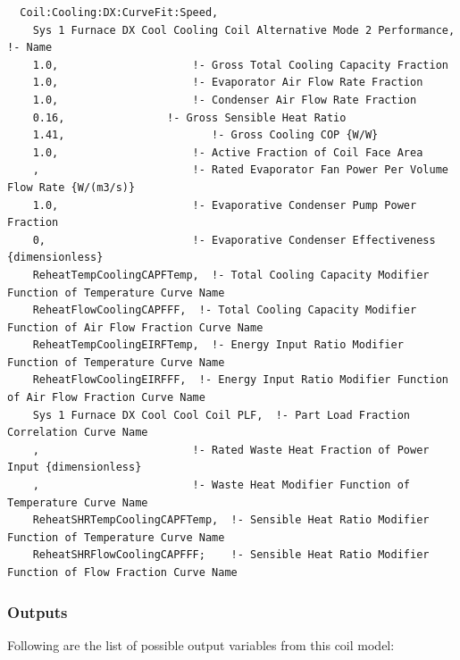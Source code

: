 \begin{lstlisting}
  Coil:Cooling:DX:CurveFit:Speed,
    Sys 1 Furnace DX Cool Cooling Coil Alternative Mode 2 Performance,  !- Name
    1.0,                     !- Gross Total Cooling Capacity Fraction
    1.0,                     !- Evaporator Air Flow Rate Fraction
    1.0,                     !- Condenser Air Flow Rate Fraction
    0.16,                !- Gross Sensible Heat Ratio
    1.41,                       !- Gross Cooling COP {W/W}
    1.0,                     !- Active Fraction of Coil Face Area
    ,                        !- Rated Evaporator Fan Power Per Volume Flow Rate {W/(m3/s)}
    1.0,                     !- Evaporative Condenser Pump Power Fraction
    0,                       !- Evaporative Condenser Effectiveness {dimensionless}
    ReheatTempCoolingCAPFTemp,  !- Total Cooling Capacity Modifier Function of Temperature Curve Name
    ReheatFlowCoolingCAPFFF,  !- Total Cooling Capacity Modifier Function of Air Flow Fraction Curve Name
    ReheatTempCoolingEIRFTemp,  !- Energy Input Ratio Modifier Function of Temperature Curve Name
    ReheatFlowCoolingEIRFFF,  !- Energy Input Ratio Modifier Function of Air Flow Fraction Curve Name
    Sys 1 Furnace DX Cool Cool Coil PLF,  !- Part Load Fraction Correlation Curve Name
    ,                        !- Rated Waste Heat Fraction of Power Input {dimensionless}
    ,                        !- Waste Heat Modifier Function of Temperature Curve Name
    ReheatSHRTempCoolingCAPFTemp,  !- Sensible Heat Ratio Modifier Function of Temperature Curve Name
    ReheatSHRFlowCoolingCAPFFF;    !- Sensible Heat Ratio Modifier Function of Flow Fraction Curve Name

\end{lstlisting}


\subsubsection{Outputs}\label{outputs-01}

Following are the list of possible output variables from this coil model:

